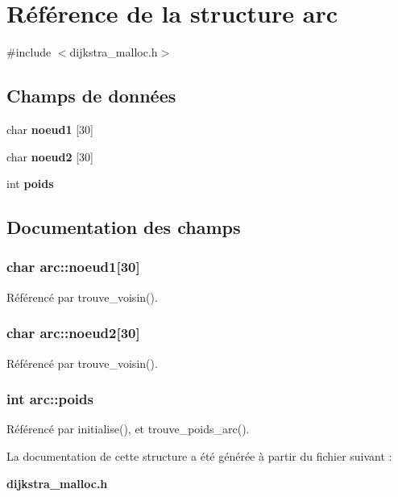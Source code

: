 \section{Référence de la structure arc}
\label{structarc}


{\ttfamily \#include $<$dijkstra\+\_\+malloc.\+h$>$}

\subsection*{Champs de données}
\begin{DoxyCompactItemize}
\item 
char {\bf noeud1} [30]
\item 
char {\bf noeud2} [30]
\item 
int {\bf poids}
\end{DoxyCompactItemize}


\subsection{Documentation des champs}
\subsubsection[{noeud1}]{\setlength{\rightskip}{0pt plus 5cm}char arc\+::noeud1[30]}\label{structarc_a1ebe7373c5baf456968bef5d3d3416e4}


Référencé par trouve\+\_\+voisin().

\subsubsection[{noeud2}]{\setlength{\rightskip}{0pt plus 5cm}char arc\+::noeud2[30]}\label{structarc_a8017141bab2e6d0c0ea75f157c6d551d}


Référencé par trouve\+\_\+voisin().

\subsubsection[{poids}]{\setlength{\rightskip}{0pt plus 5cm}int arc\+::poids}\label{structarc_a3859eb36dff284afbc474e0eb89a2b7c}


Référencé par initialise(), et trouve\+\_\+poids\+\_\+arc().



La documentation de cette structure a été générée à partir du fichier suivant \+:\begin{DoxyCompactItemize}
\item 
{\bf dijkstra\+\_\+malloc.\+h}\end{DoxyCompactItemize}
